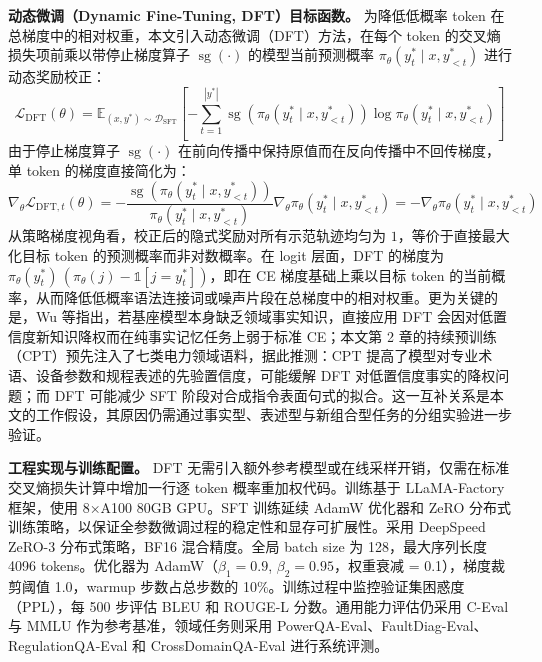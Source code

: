 \documentclass[fontset=fandol,type=master,campus=shenzhen,etitleauto=true]{hithesisbook}
\begin{document}
\textbf{动态微调（Dynamic Fine-Tuning, DFT）目标函数。} 为降低低概率 token 在总梯度中的相对权重，本文引入动态微调（DFT）方法\cite{ref82}，在每个 token 的交叉熵损失项前乘以带停止梯度算子 $\operatorname{sg}(\cdot)$ 的模型当前预测概率 $\pi_\theta(y_t^* \mid x, y_{<t}^*)$ 进行动态奖励校正：
\begin{equation}
\mathcal{L}_{\text{DFT}}(\theta) = \mathbb{E}_{(x, y^*) \sim \mathcal{D}_{\text{SFT}}} \left[ -\sum_{t=1}^{|y^*|} \operatorname{sg}\!\left(\pi_\theta(y_t^* \mid x, y_{<t}^*)\right) \log \pi_\theta(y_t^* \mid x, y_{<t}^*) \right]
\end{equation}
由于停止梯度算子 $\operatorname{sg}(\cdot)$ 在前向传播中保持原值而在反向传播中不回传梯度，单 token 的梯度直接简化为：
\begin{equation}
\nabla_\theta \mathcal{L}_{\text{DFT}, t}(\theta) = -\frac{\operatorname{sg}\!\left(\pi_\theta(y_t^* \mid x, y_{<t}^*)\right)}{\pi_\theta(y_t^* \mid x, y_{<t}^*)} \nabla_\theta \pi_\theta(y_t^* \mid x, y_{<t}^*) = -\nabla_\theta \pi_\theta(y_t^* \mid x, y_{<t}^*)
\end{equation}
从策略梯度视角看，校正后的隐式奖励对所有示范轨迹均匀为 $1$，等价于直接最大化目标 token 的预测概率而非对数概率。在 logit 层面，DFT 的梯度为 $\pi_\theta(y_t^*)\,(\pi_\theta(j) - \mathbb{1}[j = y_t^*])$，即在 CE 梯度基础上乘以目标 token 的当前概率，从而降低低概率语法连接词或噪声片段在总梯度中的相对权重。更为关键的是，Wu 等\cite{ref82}指出，若基座模型本身缺乏领域事实知识，直接应用 DFT 会因对低置信度新知识降权而在纯事实记忆任务上弱于标准 CE；本文第 2 章的持续预训练（CPT）预先注入了七类电力领域语料，据此推测：CPT 提高了模型对专业术语、设备参数和规程表述的先验置信度，可能缓解 DFT 对低置信度事实的降权问题；而 DFT 可能减少 SFT 阶段对合成指令表面句式的拟合。这一互补关系是本文的工作假设，其原因仍需通过事实型、表述型与新组合型任务的分组实验进一步验证。

\textbf{工程实现与训练配置。} DFT 无需引入额外参考模型或在线采样开销，仅需在标准交叉熵损失计算中增加一行逐 token 概率重加权代码。训练基于 LLaMA-Factory 框架，使用 8×A100 80GB GPU。SFT 训练延续 AdamW 优化器和 ZeRO 分布式训练策略，以保证全参数微调过程的稳定性和显存可扩展性\cite{ref68,ref69}。采用 DeepSpeed ZeRO-3 分布式策略，BF16 混合精度。全局 batch size 为 128，最大序列长度 4096 tokens。优化器为 AdamW（$\beta_1 = 0.9$, $\beta_2 = 0.95$，权重衰减 = 0.1），梯度裁剪阈值 1.0，warmup 步数占总步数的 10\%。训练过程中监控验证集困惑度（PPL），每 500 步评估 BLEU 和 ROUGE-L 分数。通用能力评估仍采用 C-Eval 与 MMLU 作为参考基准\cite{ref66,ref67}，领域任务则采用 PowerQA-Eval、FaultDiag-Eval、RegulationQA-Eval 和 CrossDomainQA-Eval 进行系统评测。
\end{document}
